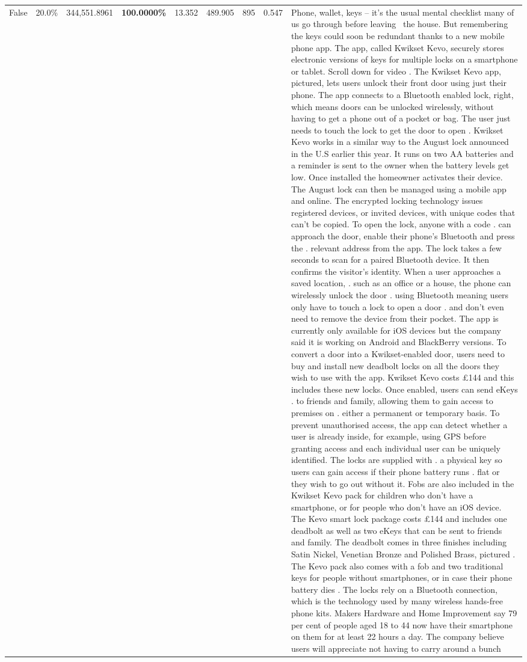 \begin{table}[H]
\begin{tabular}{lllrlllll}
False & 20.0\% & 344,551.8961 & \bfseries \color{red} 100.0000\% & 13.352 & 489.905 & 895 & 0.547 & Phone, wallet, keys – it’s the usual mental checklist many of us go through before leaving  the house. But remembering the keys could soon be redundant thanks to a new mobile phone app. The app, called Kwikset Kevo, securely stores electronic versions of keys for multiple locks on a smartphone or tablet. Scroll down for video . The Kwikset Kevo app, pictured, lets users unlock their front door using just their phone. The app connects to a Bluetooth enabled lock, right, which means doors can be unlocked wirelessly, without having to get a phone out of a pocket or bag. The user just needs to touch the lock to get the door to open . Kwikset Kevo works in a similar way to the August lock announced in the U.S earlier this year. It runs on two AA batteries and a reminder is sent to the owner when the battery levels get low. Once installed the homeowner activates their device. The August lock can then be managed using a mobile app and online. The encrypted locking technology issues registered devices, or invited devices, with unique codes that can't be copied. To open the lock, anyone with a code . can approach the door, enable their phone's Bluetooth and press the . relevant address from the app. The lock takes a few seconds to scan for a paired Bluetooth device. It then confirms the visitor's identity. When a user approaches a saved location, . such as an office or a house, the phone can wirelessly unlock the door . using Bluetooth meaning users only have to touch a lock to open a door . and don't even need to remove the device from their pocket. The app is currently only available for iOS devices but the company said it is working on Android and BlackBerry versions. To convert a door into a Kwikset-enabled door, users need to buy and install new deadbolt locks on all the doors they wish to use with the app. Kwikset Kevo costs £144 and this includes these new locks. Once enabled, users can send eKeys . to friends and family, allowing them to gain access to premises on . either a permanent or temporary basis. To prevent unauthorised access, the app can detect whether a user is already inside, for example, using GPS before granting access and each individual user can be uniquely identified. The locks are supplied with . a physical key so users can gain access if their phone battery runs . flat or they wish to go out without it. Fobs are also included in the Kwikset Kevo pack for children who don't have a smartphone, or for people who don't have an iOS device. The Kevo smart lock package costs £144 and includes one deadbolt as well as two eKeys that can be sent to friends and family. The deadbolt comes in three finishes including Satin Nickel, Venetian Bronze and Polished Brass, pictured . The Kevo pack also comes with a fob and two traditional keys for people without smartphones, or in case their phone battery dies . The locks rely on a Bluetooth connection, which is the technology used by many wireless hands-free phone kits. Makers Hardware and Home Improvement say 79 per cent of people aged 18 to 44 now have their smartphone on them for at least 22 hours a day. The company believe users will appreciate not having to carry around a bunch 
\end{tabular}
\end{table}
